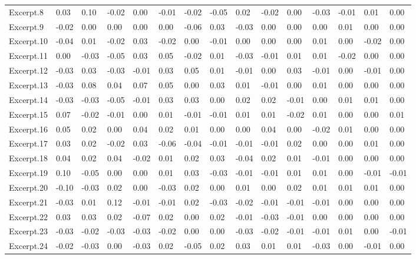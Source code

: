 \documentclass[
]{article}
\newenvironment{lltable}{\begin{landscape}\begin{center}\begin{ThreePartTable}}{\end{ThreePartTable}\end{center}\end{landscape}}
\begin{document}
\begin{lltable}
{\begin{longtable}{lllllllllllllll}
Excerpt.8 & 0.03 & 0.10 & -0.02 & 0.00 & -0.01 & -0.02 & -0.05 & 0.02 & -0.02 & 0.00 & -0.03 & -0.01 & 0.01 & 0.00\\
Excerpt.9 & -0.02 & 0.00 & 0.00 & 0.00 & 0.00 & -0.06 & 0.03 & -0.03 & 0.00 & 0.00 & 0.00 & 0.01 & 0.00 & 0.00\\
Excerpt.10 & -0.04 & 0.01 & -0.02 & 0.03 & -0.02 & 0.00 & -0.01 & 0.00 & 0.00 & 0.00 & 0.01 & 0.00 & -0.02 & 0.00\\
Excerpt.11 & 0.00 & -0.03 & -0.05 & 0.03 & 0.05 & -0.02 & 0.01 & -0.03 & -0.01 & 0.01 & 0.01 & -0.02 & 0.00 & 0.00\\
Excerpt.12 & -0.03 & 0.03 & -0.03 & -0.01 & 0.03 & 0.05 & 0.01 & -0.01 & 0.00 & 0.03 & -0.01 & 0.00 & -0.01 & 0.00\\
Excerpt.13 & -0.03 & 0.08 & 0.04 & 0.07 & 0.05 & 0.00 & 0.03 & 0.01 & -0.01 & 0.00 & 0.01 & 0.00 & 0.00 & 0.00\\
Excerpt.14 & -0.03 & -0.03 & -0.05 & -0.01 & 0.03 & 0.03 & 0.00 & 0.02 & 0.02 & -0.01 & 0.00 & 0.01 & 0.01 & 0.00\\
Excerpt.15 & 0.07 & -0.02 & -0.01 & 0.00 & 0.01 & -0.01 & -0.01 & 0.01 & 0.01 & -0.02 & 0.01 & 0.00 & 0.00 & 0.01\\
Excerpt.16 & 0.05 & 0.02 & 0.00 & 0.04 & 0.02 & 0.01 & 0.00 & 0.00 & 0.04 & 0.00 & -0.02 & 0.01 & 0.00 & 0.00\\
Excerpt.17 & 0.03 & 0.02 & -0.02 & 0.03 & -0.06 & -0.04 & -0.01 & -0.01 & -0.01 & 0.02 & 0.00 & 0.00 & 0.01 & 0.00\\
Excerpt.18 & 0.04 & 0.02 & 0.04 & -0.02 & 0.01 & 0.02 & 0.03 & -0.04 & 0.02 & 0.01 & -0.01 & 0.00 & 0.00 & 0.00\\
Excerpt.19 & 0.10 & -0.05 & 0.00 & 0.00 & 0.01 & 0.03 & -0.03 & -0.01 & -0.01 & 0.01 & 0.01 & 0.00 & -0.01 & -0.01\\
Excerpt.20 & -0.10 & -0.03 & 0.02 & 0.00 & -0.03 & 0.02 & 0.00 & 0.01 & 0.00 & 0.02 & 0.01 & 0.01 & 0.01 & 0.00\\
Excerpt.21 & -0.03 & 0.01 & 0.12 & -0.01 & -0.01 & 0.02 & -0.03 & -0.02 & -0.01 & -0.01 & -0.01 & 0.00 & 0.00 & 0.00\\
Excerpt.22 & 0.03 & 0.03 & 0.02 & -0.07 & 0.02 & 0.00 & 0.02 & -0.01 & -0.03 & -0.01 & 0.00 & 0.00 & 0.00 & 0.00\\
Excerpt.23 & -0.03 & -0.02 & -0.03 & -0.03 & -0.02 & 0.00 & 0.00 & -0.03 & -0.02 & -0.01 & -0.01 & 0.01 & 0.00 & -0.01\\
Excerpt.24 & -0.02 & -0.03 & 0.00 & -0.03 & 0.02 & -0.05 & 0.02 & 0.03 & 0.01 & 0.01 & -0.03 & 0.00 & -0.01 & 0.00\\

\end{longtable}}
\end{lltable}
\end{document}
